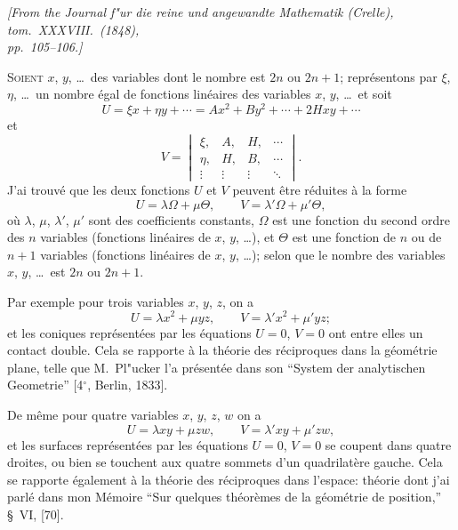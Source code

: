 \documentclass[11pt,a4paper]{book}
\begin{document}
\begin{flushright}
\textit{[From the Journal f"{u}r die reine und angewandte Mathematik (Crelle), tom.\ XXXVIII.\ (1848),\\
pp.\ 105--106.]}
\end{flushright}

\setcounter{page}{421}

\textsc{Soient} $x$, $y$, \ldots\ des variables dont le nombre est $2n$ ou $2n+1$; repr\'{e}sentons par $\xi$, $\eta$, \ldots\ un nombre \'{e}gal de fonctions lin\'{e}aires des variables $x$, $y$, \ldots\ et soit
\[
U = \xi x + \eta y + \cdots = Ax^{2} + By^{2} + \cdots + 2Hxy + \cdots
\]
et
\[
V = \begin{vmatrix}
\xi, & A, & H, & \cdots \\
\eta, & H, & B, & \cdots \\
\vdots & \vdots & \vdots & \ddots
\end{vmatrix}.
\]
J'ai trouv\'{e} que les deux fonctions $U$ et $V$ peuvent \^{e}tre r\'{e}duites \`{a} la forme
\[
U = \lambda\Omega + \mu\Theta, \qquad V = \lambda'\Omega + \mu'\Theta,
\]
o\`{u} $\lambda$, $\mu$, $\lambda'$, $\mu'$ sont des coefficients constants, $\Omega$ est une fonction du second ordre des $n$ variables (fonctions lin\'{e}aires de $x$, $y$, \ldots), et $\Theta$ est une fonction de $n$ ou de $n+1$ variables (fonctions lin\'{e}aires de $x$, $y$, \ldots); selon que le nombre des variables $x$, $y$, \ldots\ est $2n$ ou $2n+1$.

Par exemple pour trois variables $x$, $y$, $z$, on a
\[
U = \lambda x^{2} + \mu yz, \qquad V = \lambda' x^{2} + \mu' yz;
\]
et les coniques repr\'{e}sent\'{e}es par les \'{e}quations $U=0$, $V=0$ ont entre elles un contact double. Cela se rapporte \`{a} la th\'{e}orie des r\'{e}ciproques dans la g\'{e}om\'{e}trie plane, telle que M.~Pl"{u}cker l'a pr\'{e}sent\'{e}e dans son ``System der analytischen Geometrie'' [4$^{\circ}$, Berlin, 1833].

\newpage

\setcounter{page}{422}

De m\^{e}me pour quatre variables $x$, $y$, $z$, $w$ on a
\[
U = \lambda xy + \mu zw, \qquad V = \lambda' xy + \mu' zw,
\]
et les surfaces repr\'{e}sent\'{e}es par les \'{e}quations $U=0$, $V=0$ se coupent dans quatre droites, ou bien se touchent aux quatre sommets d'un quadrilat\`{e}re gauche. Cela se rapporte \'{e}galement \`{a} la th\'{e}orie des r\'{e}ciproques dans l'espace: th\'{e}orie dont j'ai parl\'{e} dans mon M\'{e}moire ``Sur quelques th\'{e}or\`{e}mes de la g\'{e}om\'{e}trie de position,'' \S~VI, [70].
\end{document}
